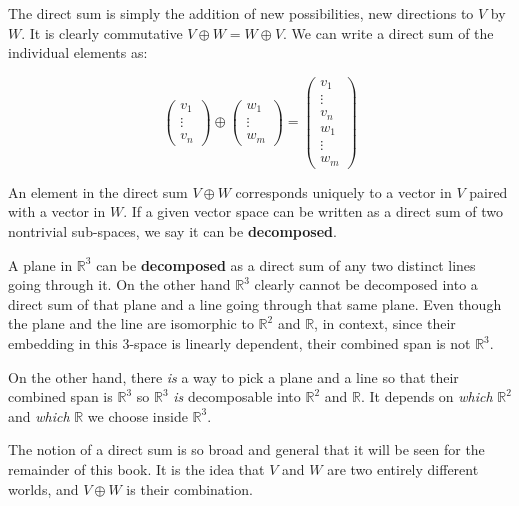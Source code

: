 	The direct sum is simply the addition of new possibilities, new directions to $V$ by $W$. It is clearly commutative $V \oplus W = W \oplus V$. We can write a direct sum of the individual elements as:
	
	\begin{equation}
		\begin{pmatrix}
			v_1 \\ \vdots \\v_n 
		\end{pmatrix}
		\oplus
		\begin{pmatrix}
			w_1 \\ \vdots \\w_m
		\end{pmatrix}
		=
		\begin{pmatrix}
			v_1 \\ \vdots \\v_n \\
			w_1 \\ \vdots \\w_m
		\end{pmatrix}
	\end{equation}
	
	An element in the direct sum $V \oplus W$ corresponds uniquely to a vector in $V$ paired with a vector in $W$. If a given vector space can be written as a direct sum of two nontrivial sub-spaces, we say it can be \textbf{decomposed}. 
	\begin{example}
		A plane in $\mathbb R^3$ can be \textbf{decomposed} as a direct sum of any two distinct lines going through it. On the other hand $\mathbb R^3$ clearly cannot be decomposed into a direct sum of that plane and a line going through that same plane. Even though the plane and the line are isomorphic to $\mathbb R^2$ and $\mathbb R$, in context, since their embedding in this 3-space is linearly dependent, their combined span is not $\mathbb{R}^3$.
		
		On the other hand, there \emph{is} a way to pick a plane and a line so that their combined span is $\mathbb R^3$ so $\mathbb R^3$ \emph{is} decomposable into $\mathbb R^2$ and $\mathbb R$. It depends on \emph{which} $\mathbb R^2$ and \emph{which} $\mathbb R$ we choose inside $\mathbb R^3$.
	\end{example}
	
	The notion of a direct sum is so broad and general that it will be seen for the remainder of this book. It is the idea that $V$ and $W$ are two entirely different worlds, and $V \oplus W$ is their combination. 
	
